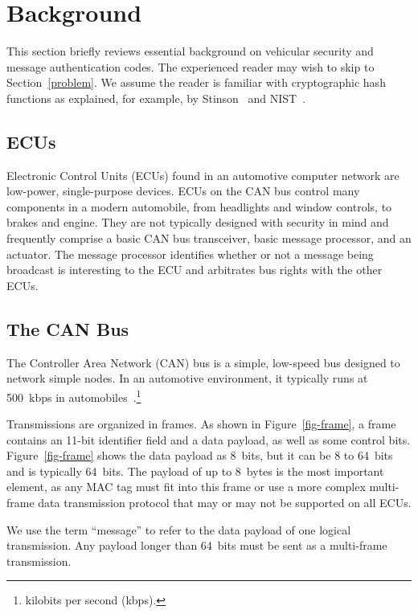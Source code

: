 \section{Background}
\label{background}

This section briefly reviews essential background on vehicular security and message authentication codes. 
The experienced reader may wish to skip to Section~\ref{problem}. 
We assume the reader is familiar with cryptographic hash functions as explained, for example, 
by Stinson~\cite{Stinson} and NIST~\cite{FIPS-180-4}.

\subsection{ECUs}
\label{ecu}

Electronic Control Units (ECUs) found in an automotive computer network are low-power, single-purpose devices. ECUs on the CAN bus control many components in a modern automobile, from headlights and window controls, to brakes and engine. They are not typically designed with security in mind and frequently comprise a basic CAN bus transceiver, basic message processor, and an actuator. The message processor identifies whether or not a message being broadcast is interesting to the ECU and arbitrates bus rights with the other ECUs. 


\subsection{The CAN Bus}
\label{can}

The Controller Area Network (CAN) bus 
is a simple, low-speed bus designed to network simple nodes. In an automotive environment, 
it typically runs at 500~kbps in automobiles~\cite{canbus}.\footnote{kilobits per second (kbps).}

Transmissions are organized in frames.  As shown in Figure~\ref{fig-frame}, 
a frame contains an 11-bit identifier field and 
a data payload, as well as some control bits. Figure~\ref{fig-frame} shows the data payload as 8~bits, but
it can be 8 to 64~bits and is typically 64~bits.
The payload of up to 8~bytes is the most important element, 
as any MAC tag must fit into this frame or use a more complex multi-frame data transmission protocol 
that may or may not be supported on all ECUs. 

We use the term ``message'' to refer to the data payload of one logical transmission.
Any payload longer than 64~bits must be sent as a multi-frame transmission.

